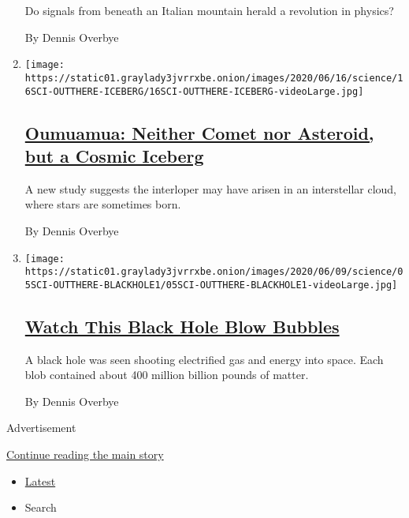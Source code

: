 \begin{enumerate}
  Do signals from beneath an Italian mountain herald a revolution in
  physics?

  By Dennis Overbye
\item
  \texttt{[image: https://static01.graylady3jvrrxbe.onion/images/2020/06/16/science/16SCI-OUTTHERE-ICEBERG/16SCI-OUTTHERE-ICEBERG-videoLarge.jpg]}

  \hypertarget{oumuamua-neither-comet-nor-asteroid-but-a-cosmic-iceberg}{%
  \subsection{\texorpdfstring{\href{/2020/06/15/science/oumuamua-astronomy-comets.html}{Oumuamua:
  Neither Comet nor Asteroid, but a Cosmic
  Iceberg}}{Oumuamua: Neither Comet nor Asteroid, but a Cosmic Iceberg}}\label{oumuamua-neither-comet-nor-asteroid-but-a-cosmic-iceberg}}

  A new study suggests the interloper may have arisen in an interstellar
  cloud, where stars are sometimes born.

  By Dennis Overbye
\item
  \texttt{[image: https://static01.graylady3jvrrxbe.onion/images/2020/06/09/science/05SCI-OUTTHERE-BLACKHOLE1/05SCI-OUTTHERE-BLACKHOLE1-videoLarge.jpg]}

  \hypertarget{watch-this-black-hole-blow-bubbles}{%
  \subsection{\texorpdfstring{\href{/2020/06/05/science/black-hole-astronomy.html}{Watch
  This Black Hole Blow
  Bubbles}}{Watch This Black Hole Blow Bubbles}}\label{watch-this-black-hole-blow-bubbles}}

  A black hole was seen shooting electrified gas and energy into space.
  Each blob contained about 400 million billion pounds of matter.

  By Dennis Overbye
\end{enumerate}

Advertisement

\protect\hyperlink{after-mid2}{Continue reading the main story}

\begin{itemize}
\tightlist
\item
  \protect\hyperlink{stream-panel}{Latest}
\item
  Search
\end{itemize}


